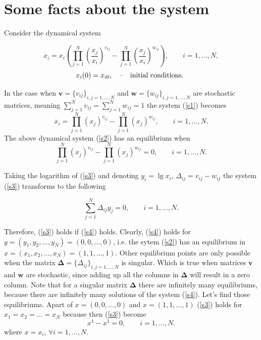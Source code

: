 \documentclass[a4paper,10pt, english]{article}
\newcommand{\D}{\displaystyle}
\begin{document}
\tableofcontents
\newpage

\section{Some facts about the system}

Consider the dynamical system 

\begin{equation}
\label{s1}
\D
\dot{x_i} = x_i \left(\prod_{j=1}^{N} \left(\frac{x_j}{x_i}\right)^{v_{ij}} - \prod_{j=1}^{N}\left(\frac{x_j}{x_i}\right)^{w_{ij}} \right), \qquad i=1,\ldots, N,
\end{equation}
$$
x_i(0) = x_{i0}, \quad \mbox{\---} \quad \mbox{initial conditions. }
$$


In the case when $\mathbf{v} = \{v_{ij}\}_{i,j=1, \ldots, N}$ and $\mathbf{w} = \{w_{ij}\}_{i,j=1, \ldots, N}$ are stochastic matrices, meaning $\sum_{j=1}^{N}v_{ij} = \sum_{j=1}^{N}w_{ij} = 1$ the system (\ref{s1}) becomes
\begin{equation}
\label{s2}
\D
\dot{x_i}  = \prod_{j=1}^{N} \left(x_j\right)^{v_{ij}} - \prod_{j=1}^{N}\left(x_j\right)^{w_{ij}} , \qquad i=1,\ldots, N.
\end{equation}
The above dynamical system (\ref{s2}) has an equilibrium when
\begin{equation}
\label{s3}
\D
 \prod_{j=1}^{N} \left(x_j\right)^{v_{ij}} - \prod_{j=1}^{N}\left(x_j\right)^{w_{ij}}  = 0, \qquad i=1,\ldots, N.
\end{equation}

Taking the logarithm of (\ref{s3}) and denoting $y_i = \lg{x_i}$, $\Delta_{ij} = v_{ij} - w_{ij}$ the system (\ref{s3}) transforms to the following

\begin{equation}
\label{s4}
\D
\sum_{j=1}^{N}\Delta_{ij}y_j = 0, \qquad i=1,\ldots, N.
\end{equation}

Therefore, (\ref{s3}) holds if  (\ref{s4}) holds. Clearly, (\ref{s4}) holds for $y=(y_1, y_2, \ldots, y_N) = (0, 0, \ldots, 0)$, i.e. the sytem (\ref{s2}) has an equilibrium in 
$x=(x_1, x_2, \ldots, x_N) = (1, 1, \ldots, 1)$. Other equilibrium points are only possible when the matrix $\mathbf{\Delta} = \{\Delta_{ij}\}_{i,j=1, \ldots, N}$ is singular.
Which is true when matrices $\mathbf{v}$ and $\mathbf{w}$ are stochastic, since adding up all the columns in $\mathbf{\Delta}$ will result in a zero column.
Note that for a singular matrix $\mathbf{\Delta}$ there are infinitely many equilibriums, because there are infinitely many solutions of the system (\ref{s4}). 
Let's find those equilibriums. Apart of  $x = (0, 0, \ldots, 0)$ and $x = (1, 1, \ldots, 1)$ (\ref{s3}) holds for $x_1 =  x_2 = \ldots = x_N$ because then (\ref{s3}) become
$$
\D
 x^1 - x^1 = 0, \qquad i=1,\ldots, N.
$$
where $x = x_i$, $\forall i=1,\ldots, N$.
\end{document}
